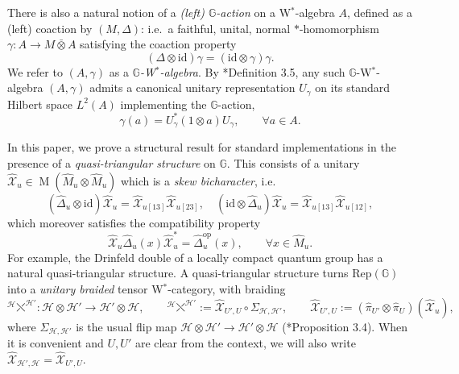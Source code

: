 \documentclass[reqno]{amsart}
\numberwithin{equation}{section}
\newcommand{\id}{\mathrm{id}}
\newcommand{\Hsp}{\mathcal{H}}
\newcommand{\G}{\mathbb{G}}
\newcommand{\opp}{\mathrm{op}}
\newcommand{\Rep}{\mathrm{Rep}}
\newcommand{\mcX}{\mathcal{X}}
\newcommand{\wh}{\widehat}
\newcommand{\Mult}{\operatorname{M}}
\newcommand{\braidnew}[2]{{}^{#1}{\fdiagovrdiag}^{#2}}
\begin{document}
There is also a natural notion of a \emph{(left) $\G$-action} on a W$^*$-algebra $A$, defined as a (left) coaction by $(M,\Delta)$: i.e.\ a faithful, unital, normal $*$-homomorphism $\gamma\colon A \rightarrow M\bar{\otimes}A$ satisfying the coaction property 
\[
(\Delta\otimes \id)\gamma = (\id\otimes \gamma)\gamma.
\]
We refer to $(A,\gamma)$ as a \emph{$\G$-W$^*$-algebra}. By \cite{Vae01}*{Definition 3.5}, any such $\G$-W$^*$-algebra $(A,\gamma)$ admits a canonical unitary representation $U_{\gamma}$ on its standard Hilbert space $L^2(A)$ implementing the $\G$-action,
\[
\gamma(a) = U_{\gamma}^*(1\otimes a)U_{\gamma},\qquad \forall a \in A. 
\]

In this paper, we prove a structural result for standard implementations in the presence of a \emph{quasi-triangular structure} on $\G$. This consists of a unitary $\wh{\mcX}_u\in \Mult(\hat{M}_u\otimes \hat{M}_u)$ which is a \emph{skew bicharacter}, i.e.
\begin{equation}\label{EqSkewBich}
(\hat{\Delta}_u\otimes \id)\wh{\mcX}_u = \wh{\mcX}_{u[13]}\wh{\mcX}_{u[23]},\quad (\id\otimes \hat{\Delta}_u)\wh{\mcX}_u = \wh{\mcX}_{u [13]}\wh{\mcX}_{u [12]},
\end{equation}
which moreover satisfies the compatibility property
\begin{equation}\label{EqCocTwist}
\wh{\mcX}_u\hat{\Delta}_u(x)\wh{\mcX}_u^* = \hat{\Delta}^{\opp}_u(x),\qquad \forall x\in \hat{M}_u.
\end{equation}
For example, the Drinfeld double of a locally compact quantum group \cite{BV05} has a natural quasi-triangular structure. A quasi-triangular structure turns $\Rep(\G)$ into a \emph{unitary braided} tensor W$^*$-category, with braiding 
\[
\braidnew{\Hsp}{\Hsp'}\colon \Hsp \otimes \Hsp'\rightarrow \Hsp'\otimes \Hsp,\qquad  \braidnew{\Hsp}{\Hsp'}:= \wh{\mcX}_{U',U}\circ \Sigma_{\Hsp,\Hsp'},\qquad \wh{\mcX}_{U',U} := (\hat{\pi}_{U'} \otimes \hat{\pi}_{U})(\wh{\mcX}_u),
\]
where $\Sigma_{\Hsp,\Hsp'}$ is the usual flip map $\Hsp \otimes \Hsp'\rightarrow \Hsp'\otimes \Hsp$ (\cite{DCKr24}*{Proposition 3.4}). When it is convenient and $U,U'$ are clear from the context, we will also write $\wh{\mcX}_{\Hsp',\Hsp}=\wh{\mcX}_{U',U}$.
\end{document}
